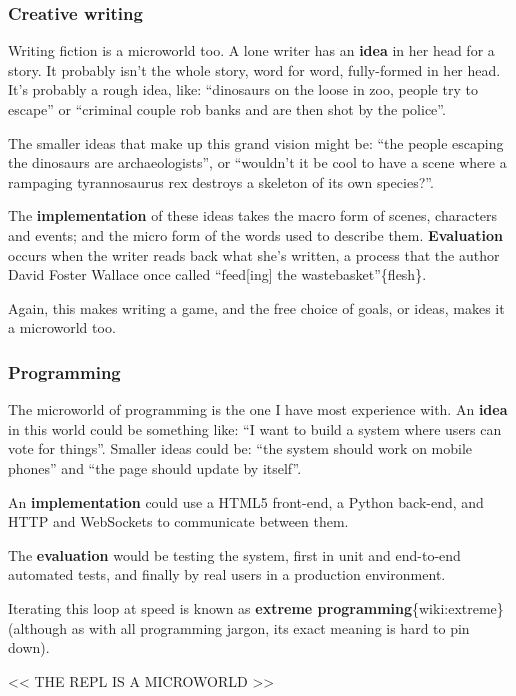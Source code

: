\subsubsection{Creative writing}

Writing fiction is a microworld too. A lone writer has an \textbf{idea}
in her head for a story. It probably isn't the whole story, word for
word, fully-formed in her head. It's probably a rough idea, like:
``dinosaurs on the loose in zoo, people try to escape'' or ``criminal
couple rob banks and are then shot by the police''.

The smaller ideas that make up this grand vision might be: ``the people
escaping the dinosaurs are archaeologists'', or ``wouldn't it be cool to
have a scene where a rampaging tyrannosaurus rex destroys a skeleton of
its own species?''.

The \textbf{implementation} of these ideas takes the macro form of
scenes, characters and events; and the micro form of the words used to
describe them. \textbf{Evaluation} occurs when the writer reads back
what she's written, a process that the author David Foster Wallace once
called ``feed{[}ing{]} the wastebasket''\{flesh\}.

Again, this makes writing a game, and the free choice of goals, or
ideas, makes it a microworld too.

\subsubsection{Programming}

The microworld of programming is the one I have most experience with. An
\textbf{idea} in this world could be something like: ``I want to build a
system where users can vote for things''. Smaller ideas could be: ``the
system should work on mobile phones'' and ``the page should update by
itself''.

An \textbf{implementation} could use a HTML5 front-end, a Python
back-end, and HTTP and WebSockets to communicate between them.

The \textbf{evaluation} would be testing the system, first in unit and
end-to-end automated tests, and finally by real users in a production
environment.

Iterating this loop at speed is known as \textbf{extreme
programming}\{wiki:extreme\} (although as with all programming jargon,
its exact meaning is hard to pin down).

\textless{}\textless{} THE REPL IS A MICROWORLD
\textgreater{}\textgreater{}

